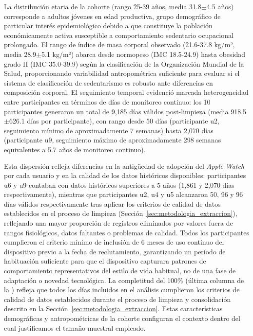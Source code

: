 La distribución etaria de la cohorte (rango 25-39 años, media 31.8$\pm$4.5 años) corresponde a adultos jóvenes en edad productiva, grupo demográfico de particular interés epidemiológico debido a que constituye la población económicamente activa susceptible a comportamiento sedentario ocupacional prolongado. El rango de índice de masa corporal observado (21.6-37.8 kg/m², media 28.9$\pm$5.1 kg/m²) abarca desde normopeso (IMC 18.5-24.9) hasta obesidad grado II (IMC 35.0-39.9) según la clasificación de la Organización Mundial de la Salud, proporcionando variabilidad antropométrica suficiente para evaluar si el sistema de clasificación de sedentarismo es robusto ante diferencias en composición corporal. El seguimiento temporal evidenció marcada heterogeneidad entre participantes en términos de días de monitoreo continuo: los 10 participantes generaron un total de 9,185 días válidos post-limpieza (media 918.5$\pm$626.1 días por participante), con rango desde 50 días (participante u2, seguimiento mínimo de aproximadamente 7 semanas) hasta 2,070 días (participante u9, seguimiento máximo de aproximadamente 298 semanas equivalentes a 5.7 años de monitoreo continuo).

Esta dispersión refleja diferencias en la antigüedad de adopción del \textit{Apple Watch} por cada usuario y en la calidad de los datos históricos disponibles: participantes u6 y u9 contaban con datos históricos superiores a 5 años (1,861 y 2,070 días respectivamente), mientras que participantes u2, u4 y u5 alcanzaron 50, 96 y 96 días válidos respectivamente tras aplicar los criterios de calidad de datos establecidos en el proceso de limpieza (Sección~\ref{sec:metodologia_extraccion}), reflejando una mayor proporción de registros eliminados por valores fuera de rangos fisiológicos, datos faltantes o problemas de calidad. Todos los participantes cumplieron el criterio mínimo de inclusión de 6 meses de uso continuo del dispositivo previo a la fecha de reclutamiento, garantizando un período de habituación suficiente para que el dispositivo capturara patrones de comportamiento representativos del estilo de vida habitual, no de una fase de adaptación o novedad tecnológica. La completitud del 100\% (última columna de la ) refleja que todos los días incluidos en el análisis cumplieron los criterios de calidad de datos establecidos durante el proceso de limpieza y consolidación descrito en la Sección~\ref{sec:metodologia_extraccion}. Estas características demográficas y antropométricas de la cohorte configuran el contexto dentro del cual justificamos el tamaño muestral empleado.


